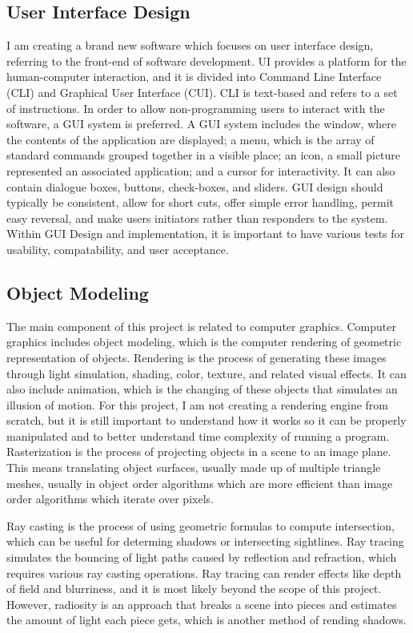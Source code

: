 \documentclass[10pt,twocolumn]{article}
\begin{document}
\subsection{User Interface Design}
I am creating a brand new software which focuses on user interface design, referring to the front-end of software development. UI provides a platform for the human-computer interaction, and it is divided into Command Line Interface (CLI) and Graphical User Interface (CUI). CLI is text-based and refers to a set of instructions. In order to allow non-programming users to interact with the software, a GUI system is preferred. A GUI system includes the window, where the contents of the application are displayed; a menu, which is the array of standard commands grouped together in a visible place; an icon, a small picture represented an associated application; and a cursor for interactivity. It can also contain dialogue boxes, buttons, check-boxes, and sliders. GUI design should typically be consistent, allow for short cuts, offer simple error handling, permit easy reversal, and make users initiators rather than responders to the system. Within GUI Design and implementation, it is important to have various tests for usability, compatability, and user acceptance. 

\subsection{Object Modeling}
The main component of this project is related to computer graphics. Computer graphics includes object modeling, which is the computer rendering of geometric representation of objects. Rendering is the process of generating these images through light simulation, shading, color, texture, and related visual effects. It can also include animation, which is the changing of these objects that simulates an illusion of motion. For this project, I am not creating a rendering engine from scratch, but it is still important to understand how it works so it can be properly manipulated and to better understand time complexity of running a program. Rasterization is the process of projecting objects in a scene to an image plane. This means translating object surfaces, usually made up of multiple triangle meshes, usually in object order algorithms which are more efficient than image order algorithms which iterate over pixels.

Ray casting is the process of using geometric formulas to compute intersection, which can be useful for determing shadows or intersecting sightlines. Ray tracing simulates the bouncing of light paths caused by reflection and refraction, which requires various ray casting operations. Ray tracing can render effects like depth of field and blurriness, and it is most likely beyond the scope of this project. However, radiosity is an approach that breaks a scene into pieces and estimates the amount of light each piece gets, which is another method of rending shadows. 
\end{document}
